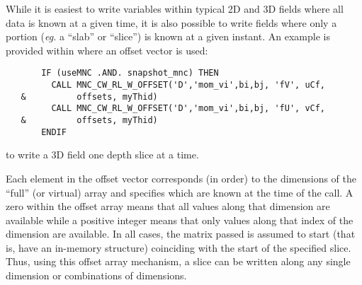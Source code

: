 While it is easiest to write variables within typical 2D and 3D fields
where all data is known at a given time, it is also possible to write
fields where only a portion (\textit{eg.} a ``slab'' or ``slice'') is
known at a given instant.  An example is provided within
where an offset vector is used: {\footnotesize
\begin{verbatim}
       IF (useMNC .AND. snapshot_mnc) THEN
         CALL MNC_CW_RL_W_OFFSET('D','mom_vi',bi,bj, 'fV', uCf,
   &          offsets, myThid)
         CALL MNC_CW_RL_W_OFFSET('D','mom_vi',bi,bj, 'fU', vCf,
   &          offsets, myThid)
       ENDIF
\end{verbatim}
}
to write a 3D field one depth slice at a time.

Each element in the offset vector corresponds (in order) to the
dimensions of the ``full'' (or virtual) array and specifies which are
known at the time of the call.  A zero within the offset array means
that all values along that dimension are available while a positive
integer means that only values along that index of the dimension are
available.  In all cases, the matrix passed is assumed to start (that
is, have an in-memory structure) coinciding with the start of the
specified slice.  Thus, using this offset array mechanism, a slice
can be written along any single dimension or combinations of
dimensions.

